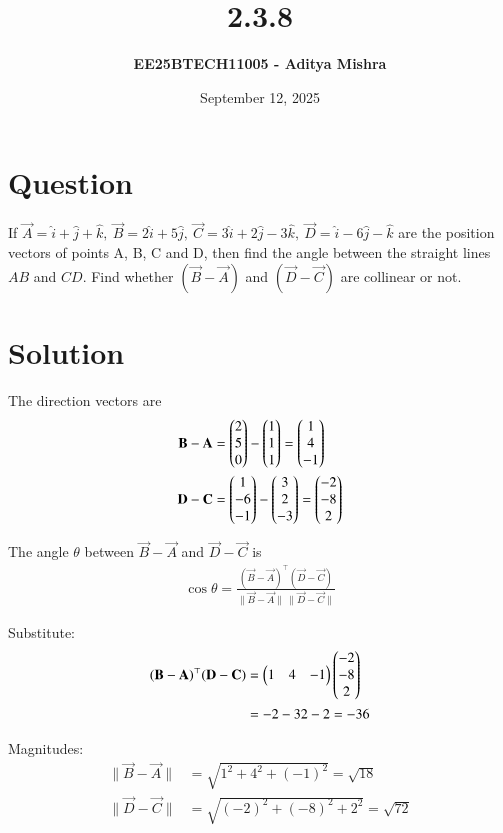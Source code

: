 \documentclass[12pt]{article}
\title{\textbf{2.3.8}}
\author{\textbf{EE25BTECH11005 - Aditya Mishra}}
\date{September 12, 2025}
\begin{document}
\maketitle
\section*{Question}
If $ \vec{A} = \hat{i} + \hat{j} + \hat{k},\ \vec{B} = 2\hat{i} + 5\hat{j},\ \vec{C} = 3\hat{i} + 2\hat{j} - 3\hat{k},\ \vec{D} = \hat{i} - 6\hat{j} - \hat{k}$ are the position vectors of points A, B, C and D, then find the angle between the straight lines $AB$ and $CD$. Find whether $(\vec{B}-\vec{A})$ and $(\vec{D}-\vec{C})$ are collinear or not.

\section*{Solution}
The direction vectors are
\begin{align}
\mathbf{B} - \mathbf{A} &= \begin{pmatrix}2\\5\\0\end{pmatrix} - \begin{pmatrix}1\\1\\1\end{pmatrix} = \begin{pmatrix}1\\4\\-1\end{pmatrix} \\
\mathbf{D} - \mathbf{C} &= \begin{pmatrix}1\\-6\\-1\end{pmatrix} - \begin{pmatrix}3\\2\\-3\end{pmatrix} = \begin{pmatrix}-2\\-8\\2\end{pmatrix}
\end{align}

The angle $\theta$ between $\vec{B}-\vec{A}$ and $\vec{D}-\vec{C}$ is
\begin{align}
\cos\theta = \frac{(\vec{B}-\vec{A})^\top (\vec{D}-\vec{C})}{\|\vec{B}-\vec{A}\|\,\|\vec{D}-\vec{C}\|}
\end{align}

Substitute:
\begin{align}
(\mathbf{B}-\mathbf{A})^\top(\mathbf{D}-\mathbf{C}) &= \begin{pmatrix}1 & 4 & -1\end{pmatrix}\begin{pmatrix}-2\\-8\\2\end{pmatrix} \\
&= -2 - 32 - 2 = -36
\end{align}

Magnitudes:
\begin{align}
\|\vec{B}-\vec{A}\| &= \sqrt{1^2+4^2+(-1)^2} = \sqrt{18} \\
\|\vec{D}-\vec{C}\| &= \sqrt{(-2)^2+(-8)^2+2^2} = \sqrt{72}
\end{align}
\end{document}
